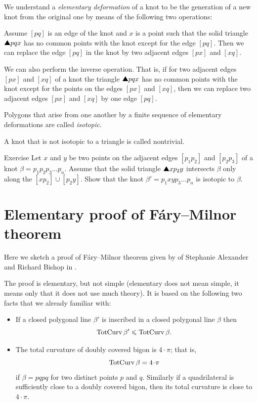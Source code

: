 We understand a \emph{elementary deformation} of a knot to be the generation of a new knot from the original one by means of the
following two operations:

Assume $[pq]$ is an edge of the knot and $x$
is a point such that the solid triangle $\solidtriangle pqx$  has no common points with the knot except for the edge $[pq]$.
Then we can replace the edge $[pq]$ in the knot by two adjacent edges $[px]$ and $[xq]$.

We can also perform the inverse operation.
That is, if for two adjacent edges $[px]$ and $[xq]$ of a knot the triangle
$\solidtriangle pqx$ has no common points with the knot except for the points on the edges $[px]$ and $[xq]$,
then we can replace two adjacent edges $[px]$ and $[xq]$ by one edge $[pq]$.

Polygons that arise from one another by a finite sequence of
elementary deformations are called \emph{isotopic}.

A knot that is not isotopic to a triangle is called nontrivial.

\begin{thm}{Exercise}\label{ex:triangle-isotopy}
Let $x$ and $y$ be two points on the adjacent edges $[p_1p_2]$ and $[p_2p_3]$ of a knot $\beta=p_1p_2p_3\dots p_n$.
Assume that the solid triangle $\solidtriangle xp_2y$ intersects $\beta$ only along the $[xp_2]\cup [p_2y]$.
Show that the knot $\beta'=p_1xyp_3\dots p_n$ is isotopic to $\beta$.
\end{thm}



\section{Elementary proof of F\'ary--Milnor theorem}

Here we sketch a proof of F\'ary--Milnor theorem given by of Stephanie Alexander and Richard Bishop in \cite{alexander-bishop}.

The proof is elementary, but not simple 
(elementary does not mean simple, it means only that it does not use much theory).
It is based on the following two facts that we already familiar with:
\begin{itemize}
\item If a closed polygonal line $\beta'$ is inscribed in a closed polygonal line $\beta$ then 
 \[\mathop{\rm TotCurv}\nolimits\beta'\leqslant \mathop{\rm TotCurv}\nolimits\beta.\]
\item The total curvature of doubly covered
bigon is $4\cdot\pi$; that is,
\[\tc\beta=4\cdot\pi\]
if $\beta=pqpq$ for two distinct points $p$ and $q$.
Similarly if a quadrilateral is sufficiently close to a doubly covered
bigon, then its total curvature is close to $4\cdot\pi$.
\end{itemize}



